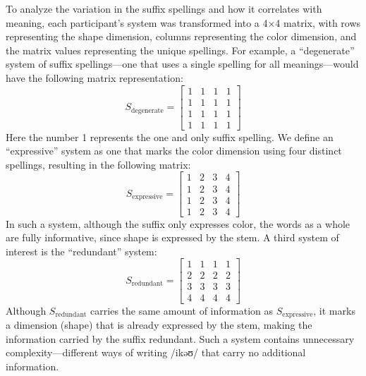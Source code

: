 \documentclass[doc,biblatex]{apa7}
\begin{document}
To analyze the variation in the suffix spellings and how it correlates with meaning, each participant's system was transformed into a 4×4 matrix, with rows representing the shape dimension, columns representing the color dimension, and the matrix values representing the unique spellings. For example, a ``degenerate'' system of suffix spellings---one that uses a single spelling for all meanings---would have the following matrix representation:
\begin{equation}
	S_\mathrm{degenerate} = \begin{bmatrix}
	1 & 1 & 1 & 1 \\
	1 & 1 & 1 & 1 \\
	1 & 1 & 1 & 1 \\
	1 & 1 & 1 & 1
	\end{bmatrix}
\end{equation}
Here the number 1 represents the one and only suffix spelling. We define an ``expressive'' system as one that marks the color dimension using four distinct spellings, resulting in the following matrix:
\begin{equation}
	S_\mathrm{expressive} = \begin{bmatrix}
	1 & 2 & 3 & 4 \\
	1 & 2 & 3 & 4 \\
	1 & 2 & 3 & 4 \\
	1 & 2 & 3 & 4
	\end{bmatrix}
\end{equation}
In such a system, although the suffix only expresses color, the words as a whole are fully informative, since shape is expressed by the stem. A third system of interest is the ``redundant'' system:
\begin{equation}
	S_\mathrm{redundant} = \begin{bmatrix}
	1 & 1 & 1 & 1 \\
	2 & 2 & 2 & 2 \\
	3 & 3 & 3 & 3 \\
	4 & 4 & 4 & 4
	\end{bmatrix}
\end{equation}
Although $S_\mathrm{redundant}$ carries the same amount of information as $S_\mathrm{expressive}$, it marks a dimension (shape) that is already expressed by the stem, making the information carried by the suffix redundant. Such a system contains unnecessary complexity---different ways of writing /ikəʊ/ that carry no additional information.
\end{document}
